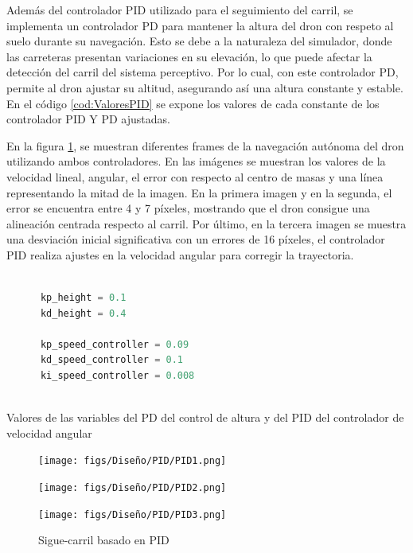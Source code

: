 Además del controlador PID utilizado para el seguimiento del carril, se implementa un controlador PD para mantener la altura del dron con respeto al suelo durante su navegación. 
Esto se debe a la naturaleza del simulador, donde las carreteras presentan variaciones en su elevación, lo que puede afectar la detección del carril del sistema perceptivo. Por lo cual, 
con este controlador PD, permite al dron ajustar su altitud, asegurando así una altura constante y estable. En el código \ref{cod:ValoresPID} se expone los valores de cada 
constante de los controlador PID Y PD ajustadas. \newline

En la figura \ref{sigue-carril}, se muestran diferentes frames de la navegación autónoma 
del dron utilizando ambos controladores. En las imágenes
se muestran los valores de la velocidad lineal, angular, el error con respecto al centro de masas y una línea representando la mitad de la imagen. 
En la primera imagen y en la segunda, el error se encuentra
entre 4 y 7 píxeles, mostrando que el dron consigue una alineación centrada respecto al carril. Por último, en la tercera imagen 
se muestra una desviación inicial significativa con un errores de 16 píxeles, el controlador
PID realiza ajustes en la velocidad angular para corregir la trayectoria. 
  \begin{code}[h]
    \begin{lstlisting}[language=Python]

      kp_height = 0.1
      kd_height = 0.4

      kp_speed_controller = 0.09
      kd_speed_controller = 0.1
      ki_speed_controller = 0.008
     
    \end{lstlisting}
    \caption[Valores de las variables del PD del control de altura y del PID del controlador de velocidad angular]{Valores de las variables del PD del control de altura y del PID del controlador de velocidad angular}
    \label{cod:ValoresPID}
    \end{code} 

    \begin{figure}[H]
      \centering
    
      \begin{minipage}[t]{0.3\textwidth}
          \centering
          \texttt{[image: figs/Diseño/PID/PID1.png]}
          \caption*{}
      \end{minipage}
      \hfill
      \begin{minipage}[t]{0.3\textwidth}
          \centering
          \texttt{[image: figs/Diseño/PID/PID2.png]}
          \caption*{}
      \end{minipage}
      \hfill
      \begin{minipage}[t]{0.3\textwidth}
          \centering
          \texttt{[image: figs/Diseño/PID/PID3.png]}
          \caption*{}
      \end{minipage}
      
      \caption{Sigue-carril basado en PID}
      \label{sigue-carril}
    \end{figure}


